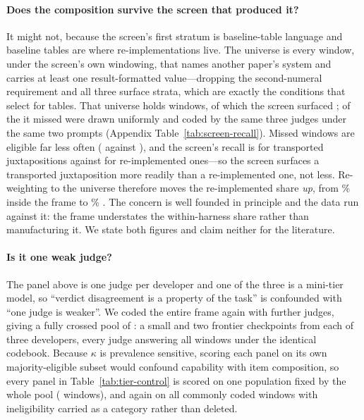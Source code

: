 \documentclass[11pt]{article}
\begin{document}
\paragraph{Does the composition survive the screen that produced it?}
It might not, because the screen's first stratum is baseline-table language and
baseline tables are where re-implementations live. The universe is every window,
under the screen's own windowing, that names another paper's system and carries
at least one result-formatted value---dropping the second-numeral requirement
and all three surface strata, which are exactly the conditions that select for
tables. That universe holds \RecUniverse{} windows, of which the screen
surfaced \FrameCandidates{}; \RecSampled{} of the \RecMissed{} it missed were
drawn uniformly and coded by the same three judges under the same two prompts
(Appendix Table~\ref{tab:screen-recall}). Missed windows are eligible far less
often (\RecEligMissed{} against \RecEligFrame{}), and the screen's recall is
\RecTrans{} \RecTransCI{} for transported juxtapositions against \RecReimpl{}
\RecReimplCI{} for re-implemented ones---so the screen surfaces a transported
juxtaposition more readily than a re-implemented one, not less. Re-weighting to
the universe therefore moves the re-implemented share \emph{up}, from
\RecFrameShare\% inside the frame to \RecUniverseShare\%
\RecUniverseShareCI{}. The concern is well founded in principle and the data run
against it: the frame understates the within-harness share rather than
manufacturing it. We state both figures and claim neither for the literature.

\paragraph{Is it one weak judge?}
The panel above is one judge per developer and one of the three is a mini-tier
model, so ``verdict disagreement is a property of the task'' is confounded with
``one judge is weaker''. We coded the entire frame again with \TierNew{} further
judges, giving a fully crossed pool of \TierPanelN{}: a small and two frontier
checkpoints from each of three developers, every judge answering all
\FrameCandidates{} windows under the identical codebook. Because $\kappa$ is
prevalence sensitive, scoring each panel on its own majority-eligible subset
would confound capability with item composition, so every panel in
Table~\ref{tab:tier-control} is scored on one population fixed by the whole pool
(\TierCommonItems{} windows), and again on all \TierAllItems{} commonly coded
windows with ineligibility carried as a category rather than deleted.
\end{document}
